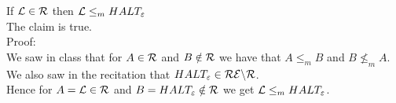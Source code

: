 If $\mathcal{L} \in \mathcal{R}$ then $\mathcal{L} \leq_m HALT_\varepsilon$ \\

The claim is true. \\

Proof: \\
We saw in class that for $A \in \mathcal{R}$ and $B \notin \mathcal{R}$ we have that $A \leq_m B$ and $B \nleq_m A$. \\
We also saw in the recitation that $HALT_\varepsilon \in \mathcal{R}\mathcal{E} \backslash \mathcal{R}$.  \\
Hence for $A = \mathcal{L} \in \mathcal{R}$ and $B = HALT_\varepsilon \notin \mathcal{R}$ we get $\mathcal{L} \leq_m HALT_\varepsilon$. \\
